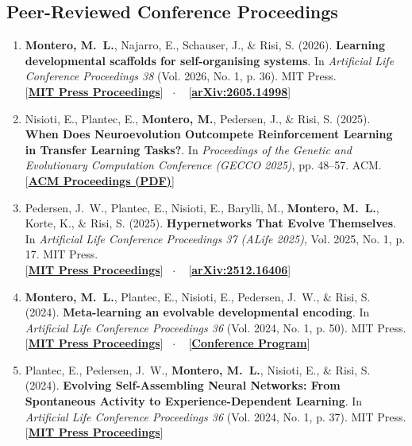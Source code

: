 \documentclass[10pt,a4paper]{article}
\newcommand{\linkbadge}[2]{%
  \textcolor{tagcolor}{[}\href{#2}{\textbf{#1}}\textcolor{tagcolor}{]}%
}
\begin{document}
\subsection*{Peer-Reviewed Conference Proceedings}
\begin{enumerate}[leftmargin=1.6em, itemsep=0.45em]
    \item \textbf{Montero, M.~L.}, Najarro, E., Schauser, J., \& Risi, S. (2026). \textbf{Learning developmental scaffolds for self-organising systems}. In \textit{Artificial Life Conference Proceedings 38} (Vol. 2026, No. 1, p. 36). MIT Press. \\
    \linkbadge{MIT Press Proceedings}{https://direct.mit.edu/isal/proceedings/isal2026/38/44/138194} \ $\cdot$ \
    \linkbadge{arXiv:2605.14998}{https://arxiv.org/abs/2605.14998}

    \item Nisioti, E., Plantec, E., \textbf{Montero, M.}, Pedersen, J., \& Risi, S. (2025). \textbf{When Does Neuroevolution Outcompete Reinforcement Learning in Transfer Learning Tasks?}. In \textit{Proceedings of the Genetic and Evolutionary Computation Conference (GECCO 2025)}, pp. 48--57. ACM. \\
    \linkbadge{ACM Proceedings (PDF)}{https://dl.acm.org/doi/pdf/10.1145/3712256.3726475}

    \item Pedersen, J.~W., Plantec, E., Nisioti, E., Barylli, M., \textbf{Montero, M.~L.}, Korte, K., \& Risi, S. (2025). \textbf{Hypernetworks That Evolve Themselves}. In \textit{Artificial Life Conference Proceedings 37 (ALife 2025)}, Vol. 2025, No. 1, p. 17. MIT Press. \\
    \linkbadge{MIT Press Proceedings}{https://direct.mit.edu/isal/proceedings/isal2025/37/17/134104} \ $\cdot$ \
    \linkbadge{arXiv:2512.16406}{https://arxiv.org/abs/2512.16406}

    \item \textbf{Montero, M.~L.}, Plantec, E., Nisioti, E., Pedersen, J.~W., \& Risi, S. (2024). \textbf{Meta-learning an evolvable developmental encoding}. In \textit{Artificial Life Conference Proceedings 36} (Vol. 2024, No. 1, p. 50). MIT Press. \\
    \linkbadge{MIT Press Proceedings}{https://direct.mit.edu/isal/proceedings/isal2024/36/50/123543} \ $\cdot$ \
    \linkbadge{Conference Program}{https://2024.alife.org/detailed_program.html}

    \item Plantec, E., Pedersen, J.~W., \textbf{Montero, M.~L.}, Nisioti, E., \& Risi, S. (2024). \textbf{Evolving Self-Assembling Neural Networks: From Spontaneous Activity to Experience-Dependent Learning}. In \textit{Artificial Life Conference Proceedings 36} (Vol. 2024, No. 1, p. 37). MIT Press. \\
    \linkbadge{MIT Press Proceedings}{https://direct.mit.edu/isal/proceedings/isal2024/36/37/123555}


\end{enumerate}
\end{document}

